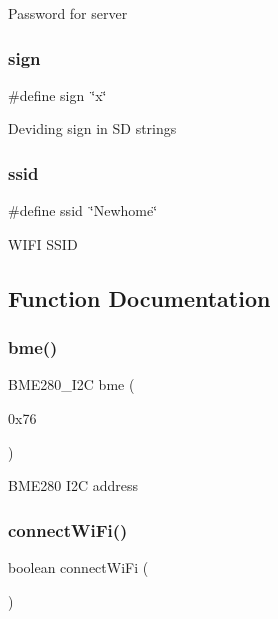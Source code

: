 Password for server \mbox{\label{_w_s_8ino_a9d8dc79272f5859f2c509c88f073dbde}} 
\subsubsection{\texorpdfstring{sign}{sign}}
{\footnotesize\ttfamily \#define sign~\char`\"{}x\char`\"{}}

Deviding sign in SD strings \mbox{\label{_w_s_8ino_abd15b8fcd3b82c2827693b9fd882a206}} 
\subsubsection{\texorpdfstring{ssid}{ssid}}
{\footnotesize\ttfamily \#define ssid~\char`\"{}Newhome\char`\"{}}

W\+I\+FI S\+S\+ID 

\subsection{Function Documentation}
\mbox{\label{_w_s_8ino_aaa44a3bc15fc4819e1e0e66a80d6a693}} 
\subsubsection{\texorpdfstring{bme()}{bme()}}
{\footnotesize\ttfamily B\+M\+E280\+\_\+\+I2C bme (\begin{DoxyParamCaption}\item[{0x76}]{ }\end{DoxyParamCaption})}

B\+M\+E280 I2C address \mbox{\label{_w_s_8ino_a144025702d7aa7708d704324ecb09eff}} 
\subsubsection{\texorpdfstring{connect\+Wi\+Fi()}{connectWiFi()}}
{\footnotesize\ttfamily boolean connect\+Wi\+Fi (\begin{DoxyParamCaption}{ }\end{DoxyParamCaption})}



